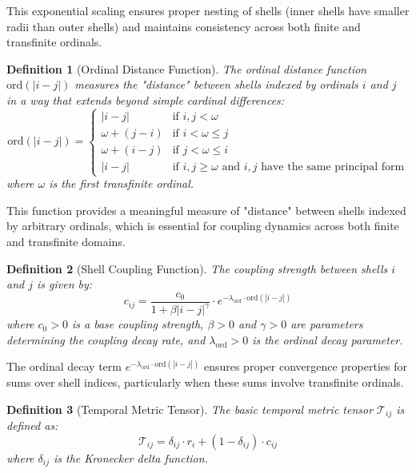 \documentclass[12pt,a4paper]{article}
\newtheorem{definition}{Definition}[section]
\newcommand{\ord}{\text{ord}}
\begin{document}
This exponential scaling ensures proper nesting of shells (inner shells have smaller radii than outer shells) and maintains consistency across both finite and transfinite ordinals.

\begin{definition}[Ordinal Distance Function]
\label{def:ordinal-distance}
The ordinal distance function $\ord(|i-j|)$ measures the "distance" between shells indexed by ordinals $i$ and $j$ in a way that extends beyond simple cardinal differences:
\begin{equation}
\ord(|i-j|) = 
\begin{cases}
|i-j| & \text{if } i,j < \omega \\
\omega + (j-i) & \text{if } i < \omega \leq j \\
\omega + (i-j) & \text{if } j < \omega \leq i \\
|i-j| & \text{if } i,j \geq \omega \text{ and } i,j \text{ have the same principal form}
\end{cases}
\end{equation}
where $\omega$ is the first transfinite ordinal.
\end{definition}

This function provides a meaningful measure of "distance" between shells indexed by arbitrary ordinals, which is essential for coupling dynamics across both finite and transfinite domains.

\begin{definition}[Shell Coupling Function]
\label{def:shell-coupling}
The coupling strength between shells $i$ and $j$ is given by:
\begin{equation}
c_{ij} = \frac{c_0}{1 + \beta |i-j|^\gamma} \cdot e^{-\lambda_{\ord} \cdot \ord(|i-j|)}
\end{equation}
where $c_0 > 0$ is a base coupling strength, $\beta > 0$ and $\gamma > 0$ are parameters determining the coupling decay rate, and $\lambda_{\ord} > 0$ is the ordinal decay parameter.
\end{definition}

The ordinal decay term $e^{-\lambda_{\ord} \cdot \ord(|i-j|)}$ ensures proper convergence properties for sums over shell indices, particularly when these sums involve transfinite ordinals.

\begin{definition}[Temporal Metric Tensor]
\label{def:temporal-metric}
The basic temporal metric tensor $\mathcal{T}_{ij}$ is defined as:
\begin{equation}
\mathcal{T}_{ij} = \delta_{ij} \cdot r_i + (1-\delta_{ij}) \cdot c_{ij}
\end{equation}
where $\delta_{ij}$ is the Kronecker delta function.
\end{definition}
\end{document}

